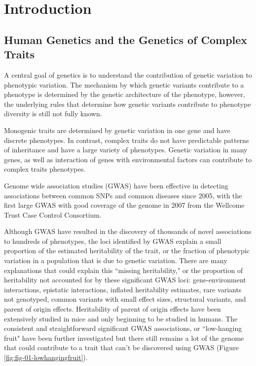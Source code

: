
\chapter{Introduction}

\section{Human Genetics and the Genetics of Complex Traits}

A central goal of genetics is to understand the contribution of genetic variation to phenotypic variation. The mechanism by which genetic variants contribute to a phenotype is determined by the genetic architecture of the phenotype, however, the underlying rules that determine how genetic variants contribute to phenotype diversity is still not fully known. 

Monogenic traits are determined by genetic variation in one gene and have discrete phenotypes. In contrast, complex traits do not have predictable patterns of inheritance and have a large variety of phenotypes. Genetic variation in many genes, as well as interaction of genes with environmental factors can contribute to complex traits phenotypes. 

Genome wide association studies (GWAS) have been effective in detecting associations between common SNPs and common diseases since 2005, with the first large GWAS with good coverage of the genome in 2007 from the Wellcome Trust Case Control Consortium\cite{WellcomeTrustCaseControlConsortium:2007do}. 

Although GWAS have resulted in the discovery of thousands of novel associations to hundreds of phenotypes, the loci identified by GWAS explain a small proportion of the estimated heritability of the trait, or the fraction of phenotypic variation in a population that is due to genetic variation. There are many explanations that could explain this ``missing heritability," or the proportion of heritability not accounted for by these significant GWAS loci: gene-environment interactions, epistatic interactions, inflated heritability estimates, rare variants not genotyped, common variants with small effect sizes, structural variants, and parent of origin effects\cite{Zaitlen2013,Eichler:2010kd,Gibson:2012kc,Zuk:cc}. Heritability of parent of origin effects have been extensively studied in mice \cite{Babak2008,Mott2014,Babak2015,Babak2012} and only beginning to be studied in humans\cite{Laurin:2017jv}. The consistent and straightforward significant GWAS associations, or ``low-hanging fruit" have been further investigated but there still remains a lot of the genome that could contribute to a trait that can't be discovered using GWAS (Figure \ref{fig:fig-01-lowhangingfruit}).

